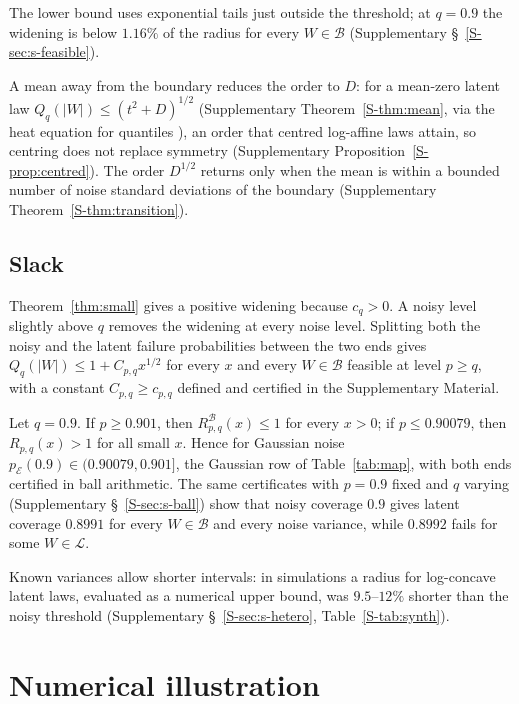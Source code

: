 \documentclass[lineno]{biometrika}
\newcommand{\LC}{\mathcal{L}}
\begin{document}
The lower bound uses exponential tails just outside the threshold; at $q = 0.9$ the widening is below $1.16\%$ of the radius for every $W \in \mathcal B$ (Supplementary \S~\ref{S-sec:s-feasible}).

A mean away from the boundary reduces the order to $D$: for a mean-zero latent law $Q_q(|W|) \le (t^2 + D)^{1/2}$ (Supplementary Theorem~\ref{S-thm:mean}, via the heat equation for quantiles \citep{steinbrecher2008}), an order that centred log-affine laws attain, so centring does not replace symmetry (Supplementary Proposition~\ref{S-prop:centred}). The order $D^{1/2}$ returns only when the mean is within a bounded number of noise standard deviations of the boundary (Supplementary Theorem~\ref{S-thm:transition}).

\subsection{Slack}\label{sec:slack}

Theorem~\ref{thm:small} gives a positive widening because $c_q > 0$. A noisy level slightly above $q$ removes the widening at every noise level. Splitting both the noisy and the latent failure probabilities between the two ends gives $Q_q(|W|) \le 1 + C_{p,q}x^{1/2}$ for every $x$ and every $W \in \mathcal B$ feasible at level $p \ge q$, with a constant $C_{p,q} \ge c_{p,q}$ defined and certified in the Supplementary Material.

\begin{corollary}\label{cor:slack}
Let $q = 0.9$. If $p \ge 0.901$, then $R^{\mathcal B}_{p,q}(x) \le 1$ for every $x > 0$; if $p \le 0.90079$, then $R_{p,q}(x) > 1$ for all small $x$. Hence for Gaussian noise $p_{\mathcal E}(0.9) \in (0.90079, 0.901]$, the Gaussian row of Table~\ref{tab:map}, with both ends certified in ball arithmetic. The same certificates with $p = 0.9$ fixed and $q$ varying (Supplementary \S~\ref{S-sec:s-ball}) show that noisy coverage $0.9$ gives latent coverage $0.8991$ for every $W \in \mathcal B$ and every noise variance, while $0.8992$ fails for some $W \in \LC$.
\end{corollary}

\label{sec:hetero}Known variances allow shorter intervals: in simulations a radius for log-concave latent laws, evaluated as a numerical upper bound, was $9.5$--$12\%$ shorter than the noisy threshold (Supplementary \S~\ref{S-sec:s-hetero}, Table~\ref{S-tab:synth}).

\section{Numerical illustration}\label{sec:numerical}
\end{document}
